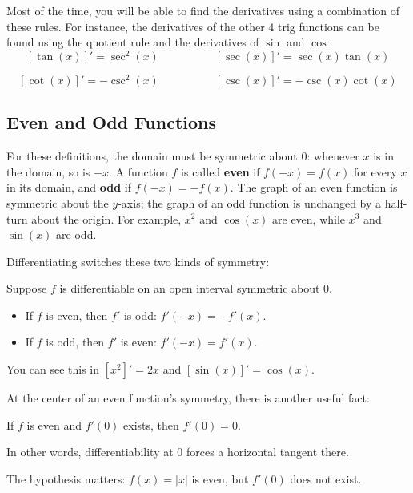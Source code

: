 Most of the time, you will be able to find the derivatives using a combination of these rules. For instance, the derivatives of the other 4 trig functions can be found using the quotient rule and the derivatives of $\sin$ and $\cos$:
$$[\tan(x)]' = \sec^2(x)
\quad\quad\quad\quad\quad
[\sec(x)]' = \sec(x)\tan(x)$$

$$[\cot(x)]' = -\csc^2(x)
\quad\quad\quad\quad\quad
[\csc(x)]' = -\csc(x)\cot(x)$$


\subsection{Even and Odd Functions}
\label{sec:even-odd-derivatives}

For these definitions, the domain must be symmetric about 0: whenever
$x$ is in the domain, so is $-x$. A function $f$ is called \textbf{even}
if $f(-x)=f(x)$ for every $x$ in its domain, and \textbf{odd} if
$f(-x)=-f(x)$. The graph of an even function is symmetric about the
$y$-axis; the graph of an odd function is unchanged by a half-turn about
the origin. For example, $x^2$ and $\cos(x)$ are even, while $x^3$ and
$\sin(x)$ are odd.

Differentiating switches these two kinds of symmetry:
\begin{thm}
Suppose $f$ is differentiable on an open interval symmetric about 0.
\begin{itemize}
\item If $f$ is even, then $f'$ is odd: $f'(-x)=-f'(x)$.
\item If $f$ is odd, then $f'$ is even: $f'(-x)=f'(x)$.
\end{itemize}
\end{thm}
\begin{exampleblock}
You can see this in $[x^2]'=2x$ and $[\sin(x)]'=\cos(x)$.
\end{exampleblock}

At the center of an even function's symmetry, there is another useful fact:
\begin{thm}
If $f$ is even and $f'(0)$ exists, then $f'(0)=0$.
\end{thm}
In other words, differentiability at 0 forces a horizontal tangent there.
\begin{exampleblock}
The hypothesis matters: $f(x)=|x|$ is even, but $f'(0)$ does not exist.
\end{exampleblock}


